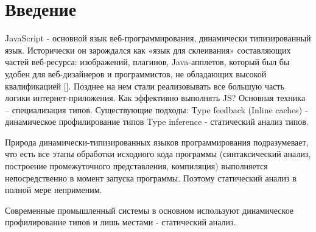\documentclass{article}
\title{}
\author{\copyright Шитов Андрей}
\date{11 января 2018}
\begin{document}
\maketitle
\thispagestyle{empty}
\newpage

\tableofcontents
\newpage

\section{Введение}

JavaScript - основной язык веб-программирования, динамически типизированный язык.
Исторически он зарождался как «язык для склеивания» составляющих частей веб-ресурса: изображений, плагинов, Java-апплетов, который был бы удобен для веб-дизайнеров и программистов, не обладающих высокой квалификацией []. Позднее на нем стали реализовывать все большую часть логики интернет-приложения. Как эффективно выполнять JS? 
Основная техника – специализация типов.
Существующие подходы:
Type feedback (Inline caches) - динамическое профилирование типов
Type inference - статический анализ типов.

Природа динамически-типизированных языков программирования подразумевает, что есть все этапы обработки исходного кода программы (синтаксический анализ, построение промежуточного представления, компиляция) выполняется непосредственно в момент запуска программы. Поэтому статический анализ в полной мере неприменим.

Современные промышленный системы в основном используют динамическое профилирование типов и лишь местами - статический анализ.

\end{document}
